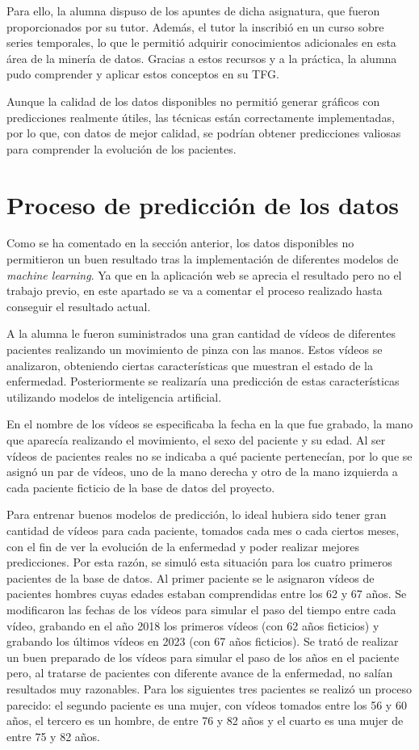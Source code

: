 Para ello, la alumna dispuso de los apuntes de dicha asignatura, que fueron proporcionados por su tutor. Además, el tutor la inscribió en un curso sobre series temporales, lo que le permitió adquirir conocimientos adicionales en esta área de la minería de datos. Gracias a estos recursos y a la práctica, la alumna pudo comprender y aplicar estos conceptos en su TFG.

Aunque la calidad de los datos disponibles no permitió generar gráficos con predicciones realmente útiles, las técnicas están correctamente implementadas, por lo que, con datos de mejor calidad, se podrían obtener predicciones valiosas para comprender la evolución de los pacientes.



\section{Proceso de predicción de los datos}
Como se ha comentado en la sección anterior, los datos disponibles no permitieron un buen resultado tras la implementación de diferentes modelos de \textit{machine learning}. Ya que en la aplicación web se aprecia el resultado pero no el trabajo previo, en este apartado se va a comentar el proceso realizado hasta conseguir el resultado actual.

A la alumna le fueron suministrados una gran cantidad de vídeos de diferentes pacientes realizando un movimiento de pinza con las manos. Estos vídeos se analizaron, obteniendo ciertas características que muestran el estado de la enfermedad. Posteriormente se realizaría una predicción de estas características utilizando modelos de inteligencia artificial.

En el nombre de los vídeos se especificaba la fecha en la que fue grabado, la mano que aparecía realizando el movimiento, el sexo del paciente y su edad. Al ser vídeos de pacientes reales no se indicaba a qué paciente pertenecían, por lo que se asignó un par de vídeos, uno de la mano derecha y otro de la mano izquierda a cada paciente ficticio de la base de datos del proyecto.

Para entrenar buenos modelos de predicción, lo ideal hubiera sido tener gran cantidad de vídeos para cada paciente, tomados cada mes o cada ciertos meses, con el fin de ver la evolución de la enfermedad y poder realizar mejores predicciones. Por esta razón, se simuló esta situación para los cuatro primeros pacientes de la base de datos. 
Al primer paciente se le asignaron vídeos de pacientes hombres cuyas edades estaban comprendidas entre los 62 y 67 años. Se modificaron las fechas de los vídeos para simular el paso del tiempo entre cada vídeo, grabando en el año 2018 los primeros vídeos (con 62 años ficticios) y grabando los últimos vídeos en 2023 (con 67 años ficticios). Se trató de realizar un buen preparado de los vídeos para simular el paso de los años en el paciente pero, al tratarse de pacientes con diferente avance de la enfermedad, no salían resultados muy razonables. Para los siguientes tres pacientes se realizó un proceso parecido: el segundo paciente es una mujer, con vídeos tomados entre los 56 y 60 años, el tercero es un hombre, de entre 76 y 82 años y el cuarto es una mujer de entre 75 y 82 años.

